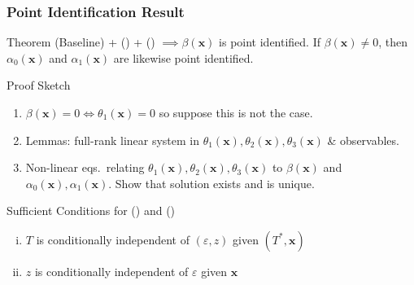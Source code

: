 \documentclass{beamer}
\begin{document}
\begin{frame}
  \frametitle{Point Identification Result}

  \small 

  \begin{alertblock}{Theorem}
    (Baseline) + (\spadesuit) + (\clubsuit) $\implies \beta(\mathbf{x})$ is point identified.
    If $\beta(\mathbf{x}) \neq 0$, then $\alpha_0(\mathbf{x})$ and $\alpha_1(\mathbf{x})$ are likewise point identified.
  \end{alertblock}

  \begin{alertblock}{Proof Sketch}
    \vspace{-0.5em}
    \begin{enumerate}
      \item $\beta(\mathbf{x})=0 \iff \theta_1(\mathbf{x}) =0$ so suppose this is not the case.  
      \item Lemmas: full-rank linear system in $\theta_1(\mathbf{x}), \theta_2(\mathbf{x}), \theta_3(\mathbf{x})$ \& observables.
      \item Non-linear eqs.\ relating $\theta_1(\mathbf{x}),\theta_2(\mathbf{x}), \theta_3(\mathbf{x})$ to  $\beta(\mathbf{x})$ and $\alpha_0(\mathbf{x}), \alpha_1(\mathbf{x})$. 
        Show that solution exists and is unique.
    \end{enumerate}
  \end{alertblock}

  \vspace{-0.5em}

  \begin{block}{Sufficient Conditions for (\spadesuit) and (\clubsuit)}
    \vspace{-0.5em}
    \begin{enumerate}[(i)]
      \item $T$ is conditionally independent of $(\varepsilon,z)$ given $(T^*,\mathbf{x})$
      \item $z$ is conditionally independent of $\varepsilon$ given $\mathbf{x}$
    \end{enumerate}
  \end{block}
  
\end{frame}
\end{document}
